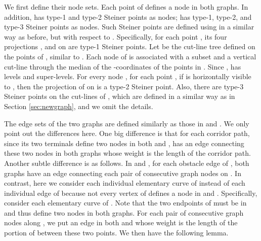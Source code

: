 \documentclass[english,runningheads,11pt]{llncs}
\begin{document}
We first define their node sets. Each point of  defines a
node in both graphs. In addition,  has type-1 and
type-2 Steiner points as nodes;  has type-1,
type-2, and type-3 Steiner points as nodes. Such Steiner points are
defined using  in a similar way as before, but with respect to .
Specifically, for
each point , its four projections
, and  on 
are type-1 Steiner points. Let  be the cut-line tree
defined on the points of , similar to .
Each node  of  is associated
with a subset  and a vertical cut-line
 through the median of the -coordinates of the points in .
Since ,  has
 levels and  super-levels.
For every node , for each point ,
if  is horizontally visible to , then the projection of 
on  is a type-2 Steiner point.
Also, there are  type-3 Steiner
points on the cut-lines of , which are defined in
a similar way as in Section \ref{sec:newgraph}, and we omit the details.

The edge sets of the two graphs are defined similarly as
those in  and . We only point out the differences here.
One big difference is that for each corridor path, since its two terminals
define two nodes in both  and ,  has
an edge connecting these two nodes in both graphs whose weight
is the length of the corridor path.
Another subtle difference is as follows.
In  and , for each obstacle edge  of , both
graphs have an edge connecting each pair of consecutive graph nodes
on . In contrast, here we consider
each individual elementary curve of  instead of each
individual edge of  because not every vertex of
 defines a node in  and .
Specifically, consider each elementary curve  of . Note that
the two endpoints of  must be in  and thus define two nodes
in both graphs. For each pair of consecutive graph nodes along , we put an edge
in both  and  whose weight is the
length of the portion of  between these two points.
We then have the following lemma.
\end{document}
